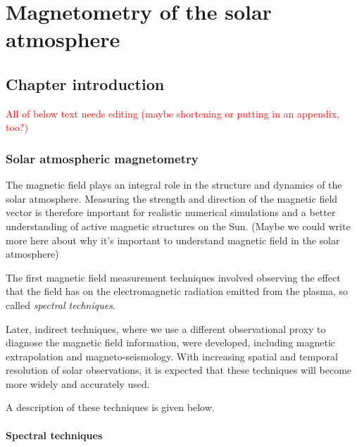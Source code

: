 \documentclass[12pt]{../style-files/ociamthesis}
\begin{document}
\baselineskip=18pt

\chapter{Magnetometry of the solar atmosphere}
\label{app: magnetometry}

\section{Chapter introduction}
\label{sec: SMS intro}



\textcolor{red}{All of below text needs editing (maybe shortening or putting in an appendix, too?)}
\subsection{Solar atmospheric magnetometry}
The magnetic field plays an integral role in the structure and dynamics of the solar atmosphere. Measuring the strength and direction of the magnetic field vector is therefore important for realistic numerical simulations and a better understanding of active magnetic structures on the Sun. (Maybe we could write more here about why it's important to understand magnetic field in the solar atmosphere)

The first magnetic field measurement techniques involved observing the effect that the field has on the electromagnetic radiation emitted from the plasma, so called \textit{spectral techniques}.

Later, indirect techniques, where we use a different observational proxy to diagnose the magnetic field information, were developed, including magnetic extrapolation and magneto-seismology. With increasing spatial and temporal resolution of solar observations, it is expected that these techniques will become more widely and accurately used.

A description of these techniques is given below.

\subsubsection{Spectral techniques}
\end{document}
